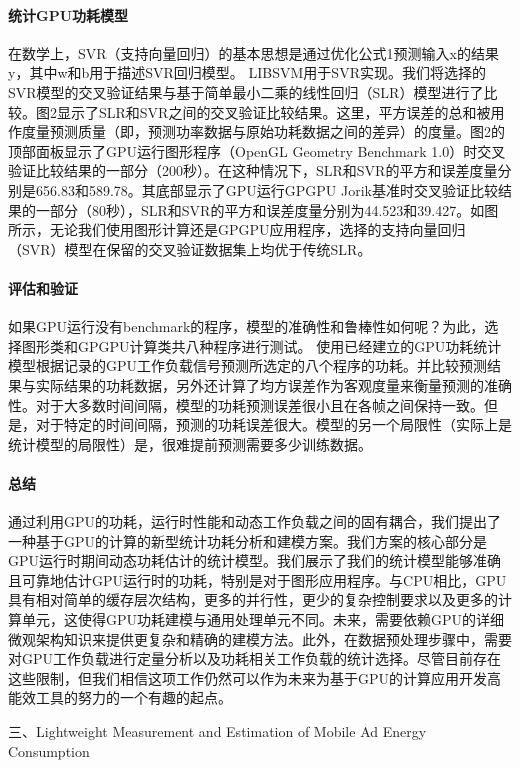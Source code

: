\documentclass[a4paper]{article}
\begin{document}
\paragraph{统计GPU功耗模型}
在数学上，SVR（支持向量回归）的基本思想是通过优化公式1预测输入x的结果y，其中w和b用于描述SVR回归模型。 LIBSVM用于SVR实现。我们将选择的SVR模型的交叉验证结果与基于简单最小二乘的线性回归（SLR）模型进行了比较。图2显示了SLR和SVR之间的交叉验证比较结果。这里，平方误差的总和被用作度量预测质量（即，预测功率数据与原始功耗数据之间的差异）的度量。图2的顶部面板显示了GPU运行图形程序（OpenGL Geometry Benchmark 1.0）时交叉验证比较结果的一部分（200秒）。在这种情况下，SLR和SVR的平方和误差度量分别是656.83和589.78。其底部显示了GPU运行GPGPU Jorik基准时交叉验证比较结果的一部分（80秒），SLR和SVR的平方和误差度量分别为44.523和39.427。如图所示，无论我们使用图形计算还是GPGPU应用程序，选择的支持向量回归（SVR）模型在保留的交叉验证数据集上均优于传统SLR。

\paragraph{评估和验证}
如果GPU运行没有benchmark的程序，模型的准确性和鲁棒性如何呢？为此，选择图形类和GPGPU计算类共八种程序进行测试。
使用已经建立的GPU功耗统计模型根据记录的GPU工作负载信号预测所选定的八个程序的功耗。并比较预测结果与实际结果的功耗数据，另外还计算了均方误差作为客观度量来衡量预测的准确性。对于大多数时间间隔，模型的功耗预测误差很小且在各帧之间保持一致。但是，对于特定的时间间隔，预测的功耗误差很大。模型的另一个局限性（实际上是统计模型的局限性）是，很难提前预测需要多少训练数据。

\paragraph{总结}
通过利用GPU的功耗，运行时性能和动态工作负载之间的固有耦合，我们提出了一种基于GPU的计算的新型统计功耗分析和建模方案。我们方案的核心部分是GPU运行时期间动态功耗估计的统计模型。我们展示了我们的统计模型能够准确且可靠地估计GPU运行时的功耗，特别是对于图形应用程序。与CPU相比，GPU具有相对简单的缓存层次结构，更多的并行性，更少的复杂控制要求以及更多的计算单元，这使得GPU功耗建模与通用处理单元不同。未来，需要依赖GPU的详细微观架构知识来提供更复杂和精确的建模方法。此外，在数据预处理步骤中，需要对GPU工作负载进行定量分析以及功耗相关工作负载的统计选择。尽管目前存在这些限制，但我们相信这项工作仍然可以作为未来为基于GPU的计算应用开发高能效工具的努力的一个有趣的起点。

三、Lightweight Measurement and Estimation of Mobile Ad Energy Consumption
						
\end{document}
